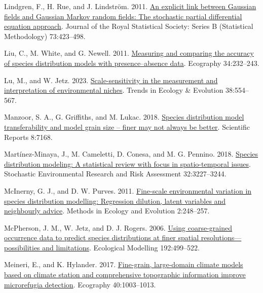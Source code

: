 \documentclass[
  12pt,
  a4paper]{article}
\newlength{\cslhangindent}
\newlength{\cslentryspacingunit} %
\newenvironment{CSLReferences}[2] %
 {%
  \setlength{\parindent}{0pt}
  \ifodd #1
  \let\oldpar\par
  \def\par{\hangindent=\cslhangindent\oldpar}
  \fi
  \setlength{\parskip}{#2\cslentryspacingunit}
 }%
 {}
\begin{document}
\begin{CSLReferences}{1}{0}
\leavevmode{}%
Lindgren, F., H. Rue, and J. Lindström. 2011. \href{https://doi.org/10.1111/j.1467-9868.2011.00777.x}{An explicit link between {Gaussian} fields and {Gaussian} {Markov} random fields: The stochastic partial differential equation approach}. Journal of the Royal Statistical Society: Series B (Statistical Methodology) 73:423--498.

\leavevmode{}%
Liu, C., M. White, and G. Newell. 2011. \href{https://doi.org/10.1111/j.1600-0587.2010.06354.x}{Measuring and comparing the accuracy of species distribution models with presence--absence data}. Ecography 34:232--243.

\leavevmode{}%
Lu, M., and W. Jetz. 2023. \href{https://doi.org/10.1016/j.tree.2023.01.003}{Scale-sensitivity in the measurement and interpretation of environmental niches}. Trends in Ecology \& Evolution 38:554--567.

\leavevmode{}%
Manzoor, S. A., G. Griffiths, and M. Lukac. 2018. \href{https://doi.org/10.1038/s41598-018-25437-1}{Species distribution model transferability and model grain size -- finer may not always be better}. Scientific Reports 8:7168.

\leavevmode{}%
Martínez-Minaya, J., M. Cameletti, D. Conesa, and M. G. Pennino. 2018. \href{https://doi.org/10.1007/s00477-018-1548-7}{Species distribution modeling: A statistical review with focus in spatio-temporal issues}. Stochastic Environmental Research and Risk Assessment 32:3227--3244.

\leavevmode{}%
McInerny, G. J., and D. W. Purves. 2011. \href{https://doi.org/10.1111/j.2041-210X.2010.00077.x}{Fine-scale environmental variation in species distribution modelling: Regression dilution, latent variables and neighbourly advice}. Methods in Ecology and Evolution 2:248--257.

\leavevmode{}%
McPherson, J. M., W. Jetz, and D. J. Rogers. 2006. \href{https://doi.org/10.1016/j.ecolmodel.2005.08.007}{Using coarse-grained occurrence data to predict species distributions at finer spatial resolutions---possibilities and limitations}. Ecological Modelling 192:499--522.

\leavevmode{}%
Meineri, E., and K. Hylander. 2017. \href{https://doi.org/10.1111/ecog.02494}{Fine-grain, large-domain climate models based on climate station and comprehensive topographic information improve microrefugia detection}. Ecography 40:1003--1013.


\end{CSLReferences}
\end{document}

